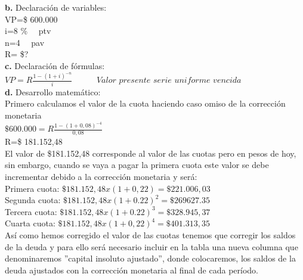 \textbf{b.}	Declaración de variables:\\

    VP=\$ 600.000\\
	i=8 \% \ \ ptv\\
	n=4 \ \ pav\\
	R= \$?\\

\textbf{c.}	Declaración de fórmulas:\\

	$VP=R \frac{1-(1+i)^{-n}}{i} \hspace{35pt}\textit{Valor presente serie uniforme vencida}$\\

\textbf{d.}	Desarrollo matemático:\\
Primero calculamos el valor de la cuota haciendo caso omiso de la corrección monetaria\\


	$\$ 600.000= R \frac{1-(1+0,08)^{-4}}{0,08}$ \\
	
	R=\$ 181.152,48\\
	
El valor de \$181.152,48 corresponde al valor de las cuotas pero en pesos de hoy, sin embargo, cuando se vaya a pagar la primera cuota este valor se debe incrementar debido a la corrección monetaria y será:\\

Primera cuota:	 $\$181.152,48 x (1 +0,22)   =\$221.006,03$\\
Segunda cuota:	 $\$181.152,48 x (1 +0.22)^{2}=\$269 627.35$\\
Tercera cuota:	 $\$181.152,48 x (1 +0.22)^{3}=\$328.945,37$ \\
Cuarta cuota:	 $\$181.152,48 x (1 +0,22)^{4}=\$401.313,35$ \\

Así como hemos corregido el valor de las cuotas tenemos que corregir los saldos de la deuda y para ello será necesario incluir en la tabla una nueva columna que denominaremos ''capital insoluto ajustado'', donde colocaremos, los saldos de la deuda ajustados con la corrección monetaria al final de cada período.\\

